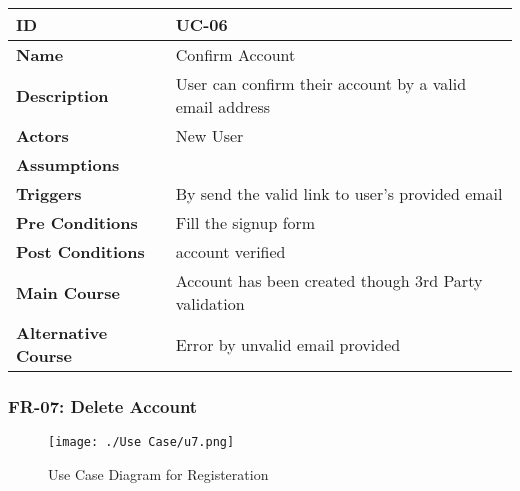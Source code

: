     \begin{center}
        \begin{tabularx}{\textwidth}{|l|X|}
            \hline
            \textbf{ID} & UC-06 \\
            \hline
            \textbf{Name} & Confirm Account \\
            \hline
            \textbf{Description} & User can confirm their account by a valid email address \\
            \hline
            \textbf{Actors} & New User \\
            \hline
            \textbf{Assumptions} &  \\
            \hline
            \textbf{Triggers} & By send the valid link to user's provided email \\
            \hline
            \textbf{Pre Conditions} & Fill the signup form \\
            \hline
            \textbf{Post Conditions} & account verified \\
            \hline
            \textbf{Main Course} & Account has been created though 3rd Party validation \\
            \hline
            \textbf{Alternative Course} & Error by unvalid email provided \\
            \hline
            
        \end{tabularx}
    \end{center}
    \newpage
    

    \subsubsection{FR-07: Delete Account}
    \begin{figure}[H]
        \texttt{[image: ./Use Case/u7.png]}
        \centering 
        \caption{Use Case Diagram for Registeration}
        \label{fig:prototype1}
        \end{figure}
        
